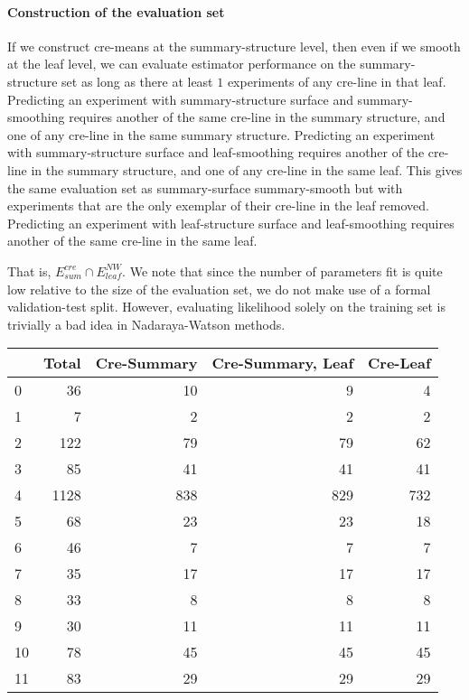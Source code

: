 \paragraph{Construction of the evaluation set}

If we construct cre-means at the summary-structure level, then even if we smooth at the leaf level, we can evaluate estimator performance on the summary-structure set  as long as there at least $1$ experiments of any cre-line in that leaf.
Predicting an experiment with summary-structure surface and summary-smoothing requires another of the same cre-line in the summary structure, and one of any cre-line in the same summary structure.
Predicting an experiment with summary-structure surface and leaf-smoothing requires another of the cre-line in the summary structure, and one of any cre-line in the same leaf.
This gives the same evaluation set as summary-surface summary-smooth but with experiments that are the only exemplar of their cre-line in the leaf removed.
Predicting an experiment with leaf-structure surface and leaf-smoothing requires another of the same cre-line in the same leaf.

That is, $E_{sum}^{cre} \cap E_{leaf}^{NW}$.
We note that since the number of parameters fit is quite low relative to the size of the evaluation set, we do not make use of a formal validation-test split.
However, evaluating likelihood solely on the training set is trivially a bad idea in Nadaraya-Watson methods.

\begin{tabular}{lrrrr}
\toprule
{} &  Total &  Cre-Summary &  Cre-Summary, Leaf &  Cre-Leaf \\
\midrule
0  &     36 &           10 &                  9 &         4 \\
1  &      7 &            2 &                  2 &         2 \\
2  &    122 &           79 &                 79 &        62 \\
3  &     85 &           41 &                 41 &        41 \\
4  &   1128 &          838 &                829 &       732 \\
5  &     68 &           23 &                 23 &        18 \\
6  &     46 &            7 &                  7 &         7 \\
7  &     35 &           17 &                 17 &        17 \\
8  &     33 &            8 &                  8 &         8 \\
9  &     30 &           11 &                 11 &        11 \\
10 &     78 &           45 &                 45 &        45 \\
11 &     83 &           29 &                 29 &        29 \\
\bottomrule
\end{tabular}

